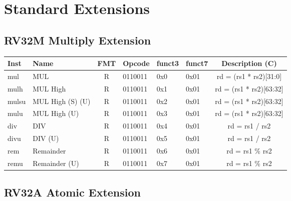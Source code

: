 \section*{Standard Extensions}

\subsection*{RV32M Multiply Extension}
\begin{center}
\begin{tabular}
{T | l | c | T | T | T | C } \hline
\rm Inst & Name              & FMT & \rm Opcode & \rm funct3 & \rm funct7 & \rm Description (C)     \\ \hline
mul      & MUL               & R   & 0110011    & 0x0    & 0x01   & rd = (rs1 * rs2)[31:0]  \\
mulh     & MUL High          & R   & 0110011    & 0x1    & 0x01   & rd = (rs1 * rs2)[63:32] \\
mulsu    & MUL High (S) (U)  & R   & 0110011    & 0x2    & 0x01   & rd = (rs1 * rs2)[63:32] \\
mulu     & MUL High (U)      & R   & 0110011    & 0x3    & 0x01   & rd = (rs1 * rs2)[63:32] \\
div      & DIV               & R   & 0110011    & 0x4    & 0x01   & rd = rs1 / rs2          \\
divu     & DIV (U)           & R   & 0110011    & 0x5    & 0x01   & rd = rs1 / rs2          \\
rem      & Remainder         & R   & 0110011    & 0x6    & 0x01   & rd = rs1 \% rs2         \\
remu     & Remainder (U)     & R   & 0110011    & 0x7    & 0x01   & rd = rs1 \% rs2         \\
\hline
\end{tabular}
\end{center}

\subsection*{RV32A Atomic Extension}


